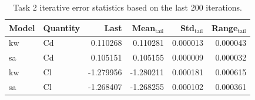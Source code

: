 \begin{table}[H]
\centering
\small
\caption{Task 2 iterative error statistics based on the last 200 iterations.}
\label{tab:task2_iter_stats}
\begin{tabular}{l l r r r r}
\toprule
Model & Quantity & Last & Mean$_{\mathrm{tail}}$ & Std$_{\mathrm{tail}}$ & Range$_{\mathrm{tail}}$ \\
\midrule
kw & Cd & 0.110268 & 0.110281 & 0.000013 & 0.000043 \\
sa & Cd & 0.105151 & 0.105155 & 0.000009 & 0.000032 \\
kw & Cl & -1.279956 & -1.280211 & 0.000181 & 0.000615 \\
sa & Cl & -1.268407 & -1.268255 & 0.000102 & 0.000361 \\
\bottomrule
\end{tabular}
\end{table}